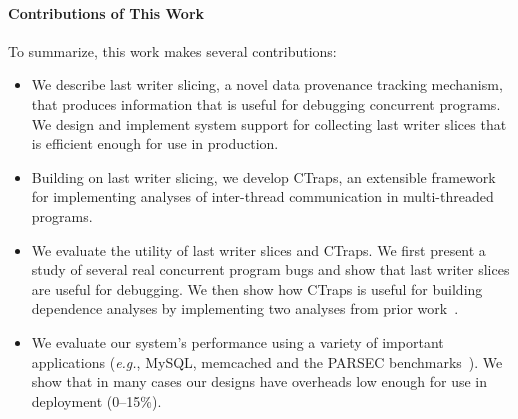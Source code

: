 \documentclass[preprint,9pt]{sigplanconf}
\newcommand{\ctraps}{CTraps\xspace}
\begin{document}
\paragraph{Contributions of This Work}
To summarize, this work makes several contributions:
\begin{itemize}

\item{We describe last writer slicing, a novel data provenance tracking
mechanism, that produces information that is useful for debugging concurrent
programs.  We design and implement system support for collecting last writer
slices that is efficient enough for use in production.  }

\item{Building on last writer slicing, we develop \ctraps, an extensible
framework for implementing analyses of inter-thread communication in
multi-threaded programs.  }

\item{We evaluate the utility of last writer slices and \ctraps. We first
present a study of several real concurrent program bugs and show that last
writer slices are useful for debugging.  We then show how \ctraps is useful for
building dependence analyses by implementing two analyses from prior
work~\cite{cci,defuse,recon}. }

\item{We evaluate our system's performance using a variety of important
applications ({\em e.g.}, MySQL, memcached and the PARSEC
benchmarks~\cite{parsec}).  We show that in many cases our designs have
overheads low enough for use in deployment (0--15\%).}

\end{itemize}




\end{document}

